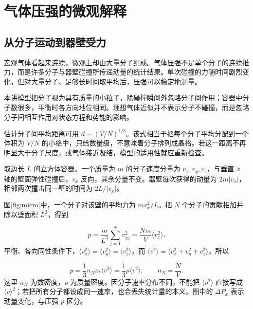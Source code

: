 \section{气体压强的微观解释}
\subsection{从分子运动到器壁受力}
宏观气体看起来连续，微观上却由大量分子组成。气体压强不是单个分子的连续推力，而是许多分子与器壁碰撞所传递动量的统计结果。单次碰撞的力随时间剧烈变化，但对大量分子、足够长时间取平均后，压强可以稳定地测量。

本讲模型把分子视为具有质量的小粒子，除碰撞瞬间外忽略分子间作用；容器中分子数很多，平衡时各方向地位相同。理想气体近似并不表示分子不碰撞，而是忽略分子间相互作用对状态方程和势能的影响。

估计分子间平均距离可用 $d\sim(V/N)^{1/3}$。该式相当于把每个分子平均分配到一个体积为 $V/N$ 的小格中，只给数量级，不意味着分子排列成晶格。若这一距离不再明显大于分子尺度，或气体接近凝结，模型的适用性就应重新检查。


取边长 $L$ 的立方体容器。一个质量为 $m$ 的分子速度分量为 $v_x,v_y,v_z$，与垂直 $x$ 轴的壁面弹性碰撞后，$v_x$ 反向，其余分量不变。器壁每次获得的动量为 $2m|v_x|$，相邻两次撞击同一壁的时间为 $2L/|v_x|$。


图\ref{fig:micro}中，一个分子对该壁的平均力为 $mv_x^2/L$。把 $N$ 个分子的贡献相加并除以壁面积 $L^2$，得到

\[p=\frac{m}{L^3}\sum_{j=1}^{N}v_{xj}^2=\frac{Nm}{V}\langle v_x^2\rangle.
\]
平衡、各向同性条件下，$\langle v_x^2\rangle=\langle v_y^2\rangle=\langle v_z^2\rangle$，而 $\langle v^2\rangle=\langle v_x^2+v_y^2+v_z^2\rangle$，所以

\begin{equation}\label{eq:t2pressure}
\boxed{p=\frac13n_Nm\langle v^2\rangle=\frac13\rho\langle v^2\rangle},\qquad n_N=\frac NV.
\end{equation}
这里 $n_N$ 为数密度，$\rho$ 为质量密度。因分子速率分布不同，不能把 $\langle v^2\rangle$ 直接写成 $\langle v\rangle^2$；若把所有分子都设成同一速率，也会丢失统计量的本义。图中的 $\Delta P_x$ 表示动量变化，与压强 $p$ 区分。

